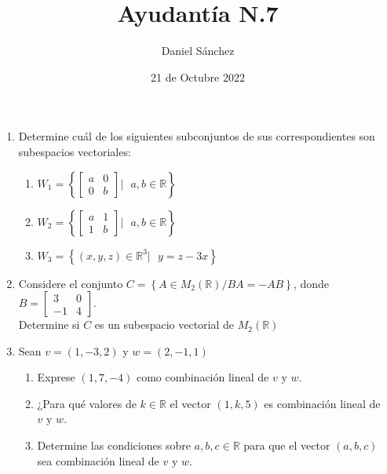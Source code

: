 \documentclass[12pt]{article}
\begin{document}
\title{Ayudant\'ia N.7}
\date{21 de Octubre 2022}
\author{Daniel S\'anchez}
\maketitle

\begin{enumerate}
    \item Determine cu\'al de los siguientes subconjuntos de sus correspondientes son subespacios vectoriales:
          \begin{enumerate}
              \item $W_1=\left\{\begin{bmatrix}
                            a & 0 \\
                            0 & b
                        \end{bmatrix}|\mbox{ }a,b\in \mathbb{R}\right\}$
              \item $W_2=\left\{\begin{bmatrix}
                            a & 1 \\
                            1 & b
                        \end{bmatrix}|\mbox{ }a,b\in \mathbb{R}\right\}$
              \item $W_3=\left\{
                        (x,y,z)\in \mathbb{R}^3|\mbox{ }y=z-3x\right\}$
          \end{enumerate}

    \item Considere el conjunto $C=\left\{A\in M_2(\mathbb{R})/BA=-AB\right\}$, donde
          $B=\begin{bmatrix}
                  3  & 0 \\
                  -1 & 4
              \end{bmatrix}$. \\Determine si $C$ es un subespacio vectorial de $M_2(\mathbb{R})$

    \item Sean $v=(1,-3,2)$ y $w=(2,-1,1)$
          \begin{enumerate}
              \item Exprese $(1,7,-4)$ como combinaci\'on lineal de $v \mbox{ y } w$.
              \item ¿Para qu\'e valores de $k \in \mathbb{R}$ el vector $(1,k,5)$ es combinaci\'on
                    lineal de $v \mbox{ y } w$.
              \item Determine las condiciones sobre $a,b,c \in \mathbb{R}$ para que el vector $(a,b,c)$ sea
                    combinaci\'on lineal de $v \mbox{ y } w$.
          \end{enumerate}


\end{enumerate}
\end{document}

